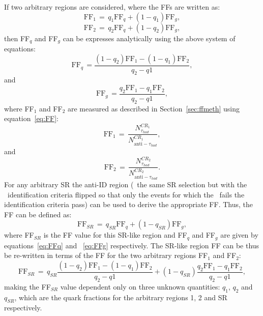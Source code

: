 	If two arbitrary regions are considered, where the \ac{FF}s are written as:
	\begin{equation}
	\textrm{FF}_1\,=\,q_1\textrm{FF}_q+(1-q_1)\textrm{FF}_g,
	\end{equation}
	\begin{equation}
	\textrm{FF}_2\,=\,q_2\textrm{FF}_q+(1-q_2)\textrm{FF}_g,
	\end{equation}
	then FF$_q$ and FF$_g$ can be expresses analytically using the above system of equations:
	\begin{equation}
	\textrm{FF}_q\,=\frac{(1-q_2)\textrm{FF}_1-(1-q_1)\textrm{FF}_2}{q_2-q1},
	\label{eq:FFq}	
	\end{equation}
	and
	\begin{equation}
	\textrm{FF}_g\,=\frac{q_2\textrm{FF}_1-q_1\textrm{FF}_2}{q_2-q1},
	\label{eq:FFg}	
	\end{equation}
	where FF$_1$ and FF$_2$ are measured as described in Section~\ref{sec:ffmeth} using equation~\ref{eq:FF}:
	\begin{equation}
	\label{eq:FF1}
	\textrm{FF}_1\,=\,\frac{N_{\tau_{had}}^{CR_1}}{N_{\textrm{anti}-\tau_{had}}^{CR_1}},
	\end{equation}
	and 
	\begin{equation}
	\label{eq:FF2}
	\textrm{FF}_2\,=\,\frac{N_{\tau_{had}}^{CR_2}}{N_{\textrm{anti}-\tau_{had}}^{CR_2}}.
	\end{equation}
	For any arbitrary \ac{SR} the anti-ID region (\ie\ the same \ac{SR} selection but with the \htau\ identification criteria flipped so that only the events for which the \htau\ fails the identification criteria pass) can be used to derive the appropriate \ac{FF}. Thus, the \ac{FF} can be defined as: 
	\begin{equation}
	\textrm{FF}_{SR}\,=\,q_{SR}\textrm{FF}_q+(1-q_{SR})\textrm{FF}_g,
	\label{eq:FF_SR}
	\end{equation}
	where FF$_{SR}$ is the FF value for this \ac{SR}-like region and FF$_q$ and FF$_g$ are given by equations~\ref{eq:FFq} and ~\ref{eq:FFg} respectively. 
	The \ac{SR}-like region \ac{FF} can be thus be re-written in terms of the \ac{FF} for the two arbitrary regions FF$_1$ and FF$_2$:
	\begin{equation}
	\textrm{FF}_{SR}\,=\,q_{SR}\frac{(1-q_2)\textrm{FF}_1-(1-q_1)\textrm{FF}_2}{q_2-q1}+(1-q_{SR})\frac{q_2\textrm{FF}_1-q_1\textrm{FF}_2}{q_2-q1},
	\end{equation}
	making the FF$_{SR}$ value dependent only on three unknown quantities: $q_1$, $q_2$ and $q_{SR}$, which are the quark fractions for the arbitrary regions 1, 2 and SR respectively.
